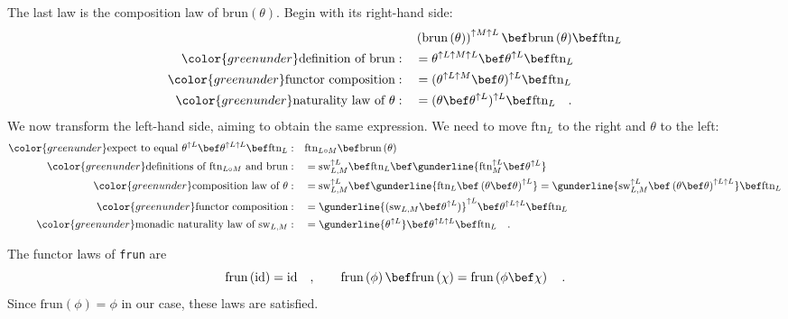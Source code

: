 The last law is the composition law of $\text{brun}\left(\theta\right)$.
Begin with its right-hand side:
\begin{align*}
 & \left(\text{brun}\,(\theta)\right)^{\uparrow M\uparrow L}\bef\text{brun}\,(\theta)\bef\text{ftn}_{L}\\
{\color{greenunder}\text{definition of }\text{brun}:}\quad & =\theta^{\uparrow L\uparrow M\uparrow L}\bef\theta^{\uparrow L}\bef\text{ftn}_{L}\\
{\color{greenunder}\text{functor composition}:}\quad & =(\theta^{\uparrow L\uparrow M}\bef\theta)^{\uparrow L}\bef\text{ftn}_{L}\\
{\color{greenunder}\text{naturality law of }\theta:}\quad & =(\theta\bef\theta^{\uparrow L})^{\uparrow L}\bef\text{ftn}_{L}\quad.
\end{align*}
We now transform the left-hand side, aiming to obtain the same expression.
We need to move $\text{ftn}_{L}$ to the right and $\theta$ to the
left: 
\begin{align*}
{\color{greenunder}\text{expect to equal }\theta^{\uparrow L}\bef\theta^{\uparrow L\uparrow L}\bef\text{ftn}_{L}:}\quad & \text{ftn}_{L\circ M}\bef\text{brun}\,(\theta)\\
{\color{greenunder}\text{definitions of }\text{ftn}_{L\circ M}\text{ and }\text{brun}:}\quad & =\text{sw}_{L,M}^{\uparrow L}\bef\text{ftn}_{L}\bef\gunderline{\text{ftn}_{M}^{\uparrow L}\bef\theta^{\uparrow L}}\\
{\color{greenunder}\text{composition law of }\theta:}\quad & =\text{sw}_{L,M}^{\uparrow L}\bef\gunderline{\text{ftn}_{L}\bef\left(\theta\bef\theta\right)^{\uparrow L}}=\gunderline{\text{sw}_{L,M}^{\uparrow L}\bef\left(\theta\bef\theta\right)^{\uparrow L\uparrow L}}\bef\text{ftn}_{L}\\
{\color{greenunder}\text{functor composition}:}\quad & =\gunderline{(\text{sw}_{L,M}\bef\theta^{\uparrow L})}^{\uparrow L}\bef\theta^{\uparrow L\uparrow L}\bef\text{ftn}_{L}\\
{\color{greenunder}\text{monadic naturality law of }\text{sw}_{L,M}:}\quad & =\gunderline{\theta^{\uparrow L}}\bef\theta^{\uparrow L\uparrow L}\bef\text{ftn}_{L}\quad.
\end{align*}

The functor laws of \lstinline!frun! are
\[
\text{frun}\left(\text{id}\right)=\text{id}\quad,\quad\quad\text{frun}\left(\phi\right)\bef\text{frun}\left(\chi\right)=\text{frun}\left(\phi\bef\chi\right)\quad.
\]
Since $\text{frun}\left(\phi\right)=\phi$ in our case, these laws
are satisfied.

